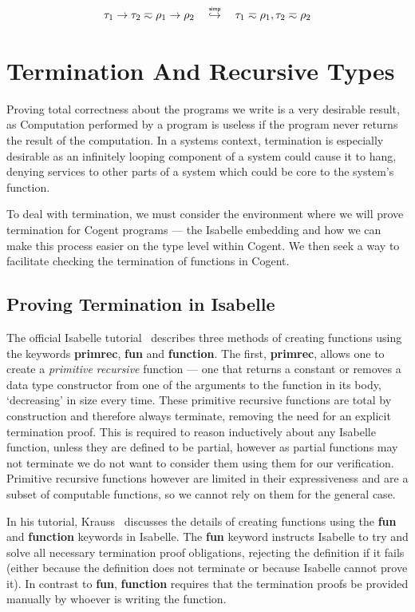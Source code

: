 \[
    \tau_1 \rightarrow \tau_2 \typeeq \rho_1 \rightarrow \rho_2 
    \hspace{1em} \simp \hspace{1em}
    \tau_1 \typeeq \rho_1, \tau_2 \typeeq \rho_2
\]



\section{Termination And Recursive Types}

Proving total correctness about the programs we write is a very desirable result, as
Computation performed by a program is useless if the program never returns the
result of the computation.
In a systems context, termination is especially desirable as an infinitely looping component of a
system could cause it to hang, denying services to other parts of a system which could be core to the
system's function.

To deal with termination, we must consider the environment where we will prove termination for
Cogent programs --- the Isabelle embedding and how we can make this process easier on the type
level within Cogent. We then seek a way to facilitate checking the termination of functions
in Cogent.

\subsection{Proving Termination in Isabelle}

The official Isabelle tutorial~\citep{IsabelleTutorial} describes three methods of creating functions using
the keywords \textbf{primrec}, \textbf{fun} and \textbf{function}. The first, \textbf{primrec},
allows one to create a \textit{primitive recursive} function --- one that returns a constant or removes
a data type constructor from one of the arguments to the function in its body, `decreasing' in size every time.
These primitive recursive functions are total by construction and therefore always terminate, removing the need for
an explicit termination proof. This is required to reason inductively about any Isabelle function,
unless they are defined to be partial, however as partial functions may not terminate we do not want
to consider them using them for our verification. Primitive recursive functions however are limited
in their expressiveness and are a subset of computable functions, so we cannot rely on them for the general case.

In his tutorial, Krauss~\citep{KraussIsabelle} discusses the details of creating functions using the \textbf{fun}
and \textbf{function} keywords in Isabelle. The \textbf{fun} keyword instructs Isabelle to try and solve all necessary
termination proof obligations, rejecting the definition if it fails (either because the definition does not 
terminate or because Isabelle cannot prove it). In contrast to \textbf{fun}, \textbf{function}
requires that the termination proofs be provided manually by whoever is writing the function.

